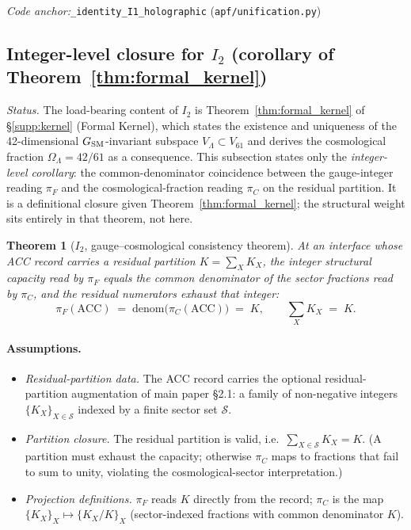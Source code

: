 \documentclass[11pt]{article}
\theoremstyle{plain}
\newtheorem{theorem}{Theorem}[section]
\theoremstyle{definition}
\theoremstyle{remark}
\newcommand{\coderef}[2]{\par\noindent\textit{Code anchor:}\quad\texttt{#1} (\texttt{#2})}
\begin{document}
\coderef{\_identity\_I1\_holographic}{apf/unification.py}

\bigskip

\subsection{Integer-level closure for \texorpdfstring{$I_2$}{I2} (corollary of Theorem~\ref{thm:formal_kernel})}\label{supp:D2}

\noindent\textit{Status.}  The load-bearing content of $I_2$ is Theorem~\ref{thm:formal_kernel} of \S\ref{supp:kernel} (Formal Kernel), which states the existence and uniqueness of the 42-dimensional $G_{\rm SM}$-invariant subspace $V_\Lambda \subset V_{61}$ and derives the cosmological fraction $\Omega_\Lambda = 42/61$ as a consequence.  This subsection states only the \emph{integer-level corollary}: the common-denominator coincidence between the gauge-integer reading $\pi_F$ and the cosmological-fraction reading $\pi_C$ on the residual partition.  It is a definitional closure given Theorem~\ref{thm:formal_kernel}; the structural weight sits entirely in that theorem, not here.

\begin{theorem}[$I_2$, gauge--cosmological consistency theorem]\label{thm:I2}
At an interface whose ACC record carries a residual partition $K = \sum_{X} K_X$, the integer structural capacity read by $\pi_F$ equals the common denominator of the sector fractions read by $\pi_C$, and the residual numerators exhaust that integer:
\[
  \pi_F(\mathrm{ACC}) \;=\; \mathrm{denom}\bigl(\pi_C(\mathrm{ACC})\bigr) \;=\; K,
  \qquad
  \sum_{X} K_X \;=\; K.
\]
\end{theorem}

\paragraph{Assumptions.}
\begin{itemize}[leftmargin=2em,itemsep=2pt]
  \item[\textbf{(P1)}] \emph{Residual-partition data.} The ACC record carries the optional residual-partition augmentation of main paper \S2.1: a family of non-negative integers $\{K_X\}_{X \in \mathcal{S}}$ indexed by a finite sector set $\mathcal{S}$.
  \item[\textbf{(P2)}] \emph{Partition closure.} The residual partition is valid, i.e.\ $\sum_{X \in \mathcal{S}} K_X = K$.  (A partition must exhaust the capacity; otherwise $\pi_C$ maps to fractions that fail to sum to unity, violating the cosmological-sector interpretation.)
  \item[\textbf{(P3)}] \emph{Projection definitions.} $\pi_F$ reads $K$ directly from the record; $\pi_C$ is the map $\{K_X\}_X \mapsto \{K_X / K\}_X$ (sector-indexed fractions with common denominator $K$).
\end{itemize}
\end{document}
